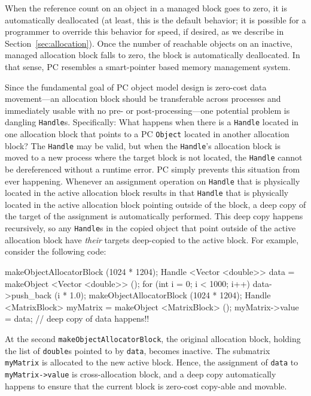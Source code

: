 When the reference count on an object in a managed block goes to zero, it is automatically
deallocated (at least, this is the default behavior; it is possible for a programmer to override this behavior for speed, if desired, as we describe in Section~\ref{sec:allocation}).  
Once the number of reachable objects on an inactive, managed allocation block falls to zero, the block is automatically deallocated.  
In that sense, PC resembles a smart-pointer based memory management system.  

Since the fundamental goal of PC object model design is 
zero-cost data movement---an allocation block should be transferable across processes and immediately usable with no pre- or post-processing---one
potential problem is dangling \texttt{Handle}s.  Specifically: What happens when there is a \texttt{Handle} located in one allocation block that points to a PC
\texttt{Object} located in another allocation block?  The \texttt{Handle} may be valid, but when the \texttt{Handle}'s allocation block is moved to a new process where
the target block is not located, the \texttt{Handle} cannot be dereferenced without a runtime error. 
PC simply prevents this situation from ever happening. Whenever an assignment operation on \texttt{Handle} that is physically located
in the active allocation block results in that
\texttt{Handle} that is physically located in the active allocation block pointing outside of the block, a deep copy of the target of the assignment
is automatically performed.  This deep copy happens recursively, so any \texttt{Handle}s in the copied object that point outside of the active allocation block
have \emph{their} targets deep-copied to the active block.  For example, consider the following code:

\begin{code}
makeObjectAllocatorBlock (1024 * 1204);
Handle <Vector <double>> data = makeObject <Vector <double>> ();
for (int i = 0; i < 1000; i++)
     data->push_back (i * 1.0);
makeObjectAllocatorBlock (1024 * 1204); 
Handle <MatrixBlock> myMatrix = makeObject <MatrixBlock> ();
myMatrix->value = data; // deep copy of data happens!!
\end{code}

At the second \texttt{makeObjectAllocatorBlock}, the original allocation block, holding the list of \texttt{double}s pointed to by \texttt{data}, becomes
inactive.  The submatrix \texttt{myMatrix} is allocated to the new active block.  
Hence, the assignment of \texttt{data} to \texttt{myMatrix->value} is cross-allocation block, and a deep copy automatically happens to ensure that
the current block is zero-cost copy-able and movable.  

